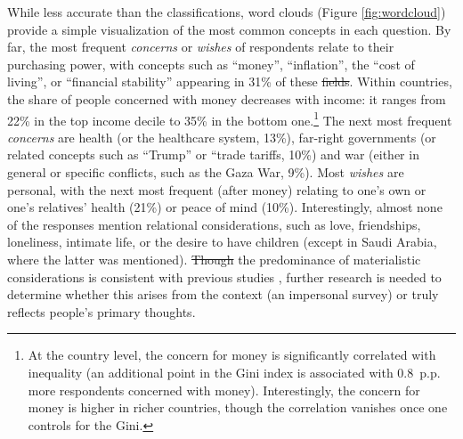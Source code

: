 \documentclass[12pt,english]{article}
\makeatletter
\providecommand{\DIFaddtex}[1]{{\protect\color{blue}\uwave{#1}}} %
\providecommand{\DIFdeltex}[1]{{\protect\color{red}\sout{#1}}} %
\providecommand{\DIFaddbegin}{} %
\providecommand{\DIFaddend}{} %
\providecommand{\DIFdelbegin}{} %
\providecommand{\DIFdelend}{} %
\providecommand{\DIFadd}[1]{\texorpdfstring{\DIFaddtex{#1}}{#1}} %
\providecommand{\DIFdel}[1]{\texorpdfstring{\DIFdeltex{#1}}{}} %
\providecommand{\DIFscaledelfig}{0.5}
\newlength{\DIFdelgraphicswidth} %
\newlength{\DIFdelgraphicsheight} %
\providecommand{\DIFaddincludegraphics}[2][]{{\color{blue}\fbox{\DIFOincludegraphics[#1]{#2}}}} %
\providecommand{\DIFdelincludegraphics}[2][]{%
\sbox{\DIFdelgraphicsbox}{\DIFOincludegraphics[#1]{#2}}%
\settoboxwidth{\DIFdelgraphicswidth}{\DIFdelgraphicsbox} %
\settoboxtotalheight{\DIFdelgraphicsheight}{\DIFdelgraphicsbox} %
\scalebox{\DIFscaledelfig}{%
\parbox[b]{\DIFdelgraphicswidth}{\usebox{\DIFdelgraphicsbox}\\[-\baselineskip] \rule{\DIFdelgraphicswidth}{0em}}\llap{\resizebox{\DIFdelgraphicswidth}{\DIFdelgraphicsheight}{%
\setlength{\unitlength}{\DIFdelgraphicswidth}%
\begin{picture}(1,1)%
\thicklines\linethickness{2pt} %
{\color[rgb]{1,0,0}\put(0,0){\framebox(1,1){}}}%
{\color[rgb]{1,0,0}\put(0,0){\line( 1,1){1}}}%
{\color[rgb]{1,0,0}\put(0,1){\line(1,-1){1}}}%
\end{picture}%
}\hspace*{3pt}}} %
} %
\DeclareRobustCommand{\DIFaddbegin}{\DIFOaddbegin \let\includegraphics\DIFaddincludegraphics} %
\DeclareRobustCommand{\DIFaddend}{\DIFOaddend \let\includegraphics\DIFOincludegraphics} %
\DeclareRobustCommand{\DIFdelbegin}{\DIFOdelbegin \let\includegraphics\DIFdelincludegraphics} %
\DeclareRobustCommand{\DIFdelend}{\DIFOaddend \let\includegraphics\DIFOincludegraphics} %
\let\sout@orig\sout %
\renewcommand{\sout}[1]{\ifmmode\text{\sout@orig{\ensuremath{#1}}}\else\sout@orig{#1}\fi} %
\makeatother
\begin{document}
While less accurate than the classifications, word clouds (Figure \ref{fig:wordcloud}) provide a simple visualization of the most common concepts in each question. By far, the most frequent \textit{concerns} or \textit{wishes} of respondents relate to their purchasing power, with concepts such as ``money'', ``inflation'', the ``cost of living'', or ``financial stability'' appearing in 31\% of these \DIFdelbegin \DIFdel{fields}\DIFdelend \DIFaddbegin \DIFadd{answers}\DIFaddend . Within countries, the share of people concerned with money decreases with income: it ranges from 22\% in the top income decile to 35\% in the bottom one.\footnote{At the country level, the concern for money is significantly correlated with inequality (an additional point in the Gini index is associated with 0.8~p.p. more respondents concerned with money). %
Interestingly, the concern for money is higher in richer countries, though the correlation vanishes once one controls for the Gini.} 
The next most frequent \textit{concerns} are health (or the healthcare system, 13\%), far-right governments (or related concepts such as ``Trump'' or ``trade tariffs\DIFaddbegin \DIFadd{''}\DIFaddend , 10\%) and war (either in general or specific conflicts, such as the Gaza War, 9\%). Most \textit{wishes} are personal, with the next most frequent (after money) relating to one's own or one's relatives' health (21\%) or peace of mind (10\%). Interestingly, almost none of the responses mention relational considerations, such as love, friendships, loneliness, intimate life, or the desire to have children (except in Saudi Arabia, where the latter was mentioned). %
\DIFdelbegin \DIFdel{Though }\DIFdelend \DIFaddbegin \DIFadd{Although }\DIFaddend the predominance of materialistic considerations is consistent with previous studies \citep{wlezien_salience_2005,singer_who_2011}, further research is needed to determine whether this arises from the context (an impersonal survey) or truly reflects people's primary thoughts. 
\end{document}
